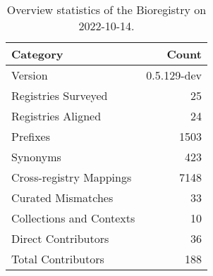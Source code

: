 \begin{table}
\centering
\caption{Overview statistics of the Bioregistry on 2022-10-14.}
\label{tab:bioregistry-summary}
\begin{tabular}{lr}
\toprule
                Category &       Count \\
\midrule
                 Version & 0.5.129-dev \\
     Registries Surveyed &          25 \\
      Registries Aligned &          24 \\
                Prefixes &        1503 \\
                Synonyms &         423 \\
 Cross-registry Mappings &        7148 \\
      Curated Mismatches &          33 \\
Collections and Contexts &          10 \\
     Direct Contributors &          36 \\
      Total Contributors &         188 \\
\bottomrule
\end{tabular}
\end{table}
